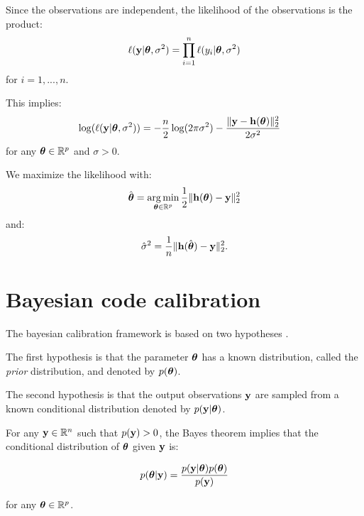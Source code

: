 \documentclass{beamer}
\begin{document}

\begin{frame}
Since the observations are independent, the likelihood of the observations is 
the product:
$$
\ell({\bf y}|\boldsymbol{\theta},\sigma^2) = 
\prod_{i=1}^n \ell(y_i|\boldsymbol{\theta},\sigma^2)
$$
for $i=1,...,n$. 

This implies:
\begin{align*}
\log(\ell({\bf y}|\boldsymbol{\theta},\sigma^2)) 
&= -\frac{n}{2} \log(2\pi \sigma^2)
-\frac{\|{\bf y} - {\bf h}(\boldsymbol{\theta})\|_2^2}{2 \sigma^2}
\end{align*}
for any $\boldsymbol{\theta}\in\mathbb{R}^p$ and $\sigma>0$. 

We maximize the likelihood with:
\begin{align*}
\hat{\boldsymbol{\theta}}
= \operatorname*{arg\,min}_{\boldsymbol{\theta}\in\mathbb{R}^p} \frac{1}{2} \| {\bf h}(\boldsymbol{\theta}) - {\bf y}\|_2^2
\end{align*}
and:
\begin{align*}
\hat{\sigma}^2
= \frac{1}{n} \| {\bf h}(\hat{\boldsymbol{\theta}}) - {\bf y}\|_2^2.
\end{align*}

\end{frame}

\section{Bayesian code calibration}

\begin{frame}

The bayesian calibration framework is based on two hypotheses 
\cite{Tarantola2005, Asch2016}.

The first hypothesis is that the parameter $\boldsymbol{\theta}$ has a
known distribution, called the \emph{prior} distribution, and denoted by
$p(\boldsymbol{\theta})$.

The second hypothesis is that the output observations
${\bf y}$ are sampled from a known
conditional distribution denoted by $p({\bf y} | \boldsymbol{\theta})$.

For any ${\bf y}\in\mathbb{R}^{n}$ such that $p({\bf y})>0$,
the Bayes theorem implies that the conditional distribution of
$\boldsymbol{\theta}$ given ${\bf y}$ is:

$$
p(\boldsymbol{\theta} | {\bf y}) = \frac{p({\bf y} | \boldsymbol{\theta}) p(\boldsymbol{\theta})}{p({\bf y})}
$$

for any $\boldsymbol{\theta}\in\mathbb{R}^p$.

\end{frame}
\end{document}
